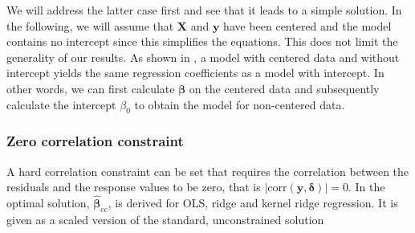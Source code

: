 \documentclass[utf8]{frontiersSCNS} %
\renewcommand{\b}{\boldsymbol{\beta}} %
\newcommand{\bcc}{\boldsymbol{\hat{\beta}}_\text{cc}} %
\newcommand{\corr}{\text{corr}}
\renewcommand{\d}{\boldsymbol{\delta}}
\renewcommand{\L}{\mathcal{L}}
\newcommand{\x}{\mathbf{x}}
\newcommand{\X}{\mathbf{X}}
\newcommand{\y}{\mathbf{y}}
\newcommand{\yh}{\mathbf{\hat{y}}}
\begin{document}
We will address the latter case first and see that it leads to a simple solution. In the following, we will assume that $\X$ and $\y$ have been centered and the model contains no intercept since this simplifies the equations.  This does not limit the generality of our results. As shown in , a model with centered data and without intercept yields the same regression coefficients as a model with intercept. In other words, we can first calculate $\b$ on the centered data and subsequently calculate the intercept $\beta_0$ to obtain the model for non-centered data.







\subsubsection{Zero correlation constraint}\label{sec:zero_correlation_constraint}

A hard correlation constraint can be set that requires the correlation between the residuals and the response values to be zero, that is $|\corr(\y,\d)|=0$. In  the optimal solution, $\bcc$, is derived for OLS, ridge and kernel ridge regression. It is given as a scaled version of the standard, unconstrained solution
\end{document}
